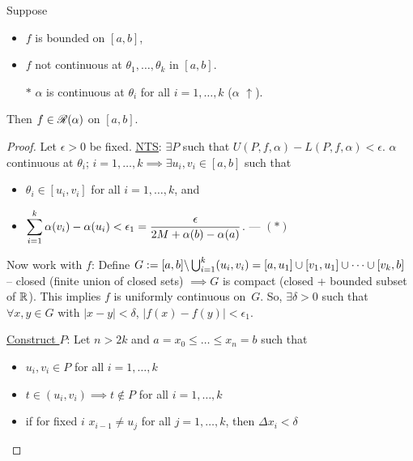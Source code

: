 \documentclass[]{article}
\begin{document}
\begin{theorem}
	Suppose
	\begin{itemize}
		\item $f$ is bounded on $[a,b]$,
		\item $f$ not continuous at $\theta_1,\dots,\theta_k$ in $[a,b]$.
	\end{itemize}
	\begin{enumerate}
		\item[$*$] $\alpha$ is continuous at $\theta_i$ for all $i=1,\dots,k$ ($\alpha$ $\uparrow$).
	\end{enumerate}
	Then $f\in\mathscr{R}(\alpha)$ on $[a,b]$.
\end{theorem}
\begin{proof}
	Let $\epsilon>0$ be fixed. \ul{\ul{NTS}}: $\exists P$ such that $U(P,f,\alpha)-L(P,f,\alpha)<\epsilon$.
	$\alpha$ continuous at $\theta_i$; $i=1,\dots,k \implies \exists u_i,v_i\in[a,b]$ such that 
	\begin{itemize}
		\item $\theta_i\in[u_i,v_i]$ for all $i=1,\dots,k$, and
		\item $\displaystyle\sum_{i=1}^k \alpha(v_i) - \alpha(u_i) <\epsilon_1 = \frac\epsilon{2M+\alpha(b)-\alpha(a)}$. --- $(*)$
	\end{itemize}
	Now work with $f$: Define $G:= [a,b]\backslash\bigcup_{i=1}^k(u_i,v_i) = [a,u_1]\cup[v_1,u_1]\cup\dots\cup[v_k,b]$ -- closed (finite union of closed sets) $\implies G$ is compact (closed + bounded subset of $\mathbb{R}$).
	This implies $f$ is uniformly continuous on~$G$.
	So, $\exists\delta>0$ such that $\forall x,y\in G$ with $|x-y|<\delta$, $|f(x)-f(y)|<\epsilon_1$.

	\ul{Construct $P$}: Let $n>2k$ and $a =x_0\leq\dots\leq x_n = b$ such that
	\begin{itemize}
		\item $u_i,v_i\in P$ for all $i=1,\dots,k$
		\item $t\in(u_i,v_i) \implies t\notin P$ for all $i=1,\dots,k$
		\item if for fixed $i$ $x_{i-1}\neq u_j$ for all $j=1,\dots,k$, then $\Delta x_i<\delta$


\end{itemize}
\end{proof}
\end{document}
